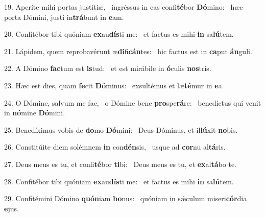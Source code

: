 19. Aperíte mihi portas justítiæ, \dag\  ingréssus in eas confi\textbf{té}bor \textbf{Dó}mino: \ast\  hæc porta Dómini, justi in\textbf{trá}bunt in \textbf{e}am.\

20. Confitébor tibi quóniam \textbf{ex}au\textbf{dís}ti me: \ast\  et factus es mihi \textbf{in} sa\textbf{lú}tem.\

21. Lápidem, quem reprobavérunt æ\textbf{di}fi\textbf{cán}tes: \ast\  hic factus est in \textbf{ca}put \textbf{án}guli.\

22. A Dómino \textbf{fac}tum est \textbf{is}tud: \ast\  et est mirábile in \textbf{ó}culis \textbf{nos}tris.\

23. Hæc est dies, quam \textbf{fe}cit \textbf{Dó}minus: \ast\  exsultémus et læ\textbf{té}mur in \textbf{e}a.\

24. O Dómine, salvum me fac, \dag\  o Dómine bene \textbf{pro}spe\textbf{rá}re: \ast\  benedíctus qui venit in \textbf{nó}mine \textbf{Dó}mini.\

25. Benedíximus vobis de \textbf{do}mo \textbf{Dó}mini: \ast\  Deus Dóminus, et il\textbf{lú}xit \textbf{no}bis.\

26. Constitúite diem solémnem \textbf{in} con\textbf{dén}sis, \ast\  usque ad \textbf{cor}nu al\textbf{tá}ris.\

27. Deus meus es tu, et confi\textbf{té}bor \textbf{ti}bi: \ast\  Deus meus es tu, et \textbf{ex}al\textbf{tá}bo te.\

28. Confitébor tibi quóniam \textbf{ex}au\textbf{dís}ti me: \ast\  et factus es mihi \textbf{in} sa\textbf{lú}tem.\

29. Confitémini Dómino \textbf{quón}iam \textbf{bo}nus: \ast\  quóniam in sǽculum miseri\textbf{cór}dia \textbf{e}jus.\

